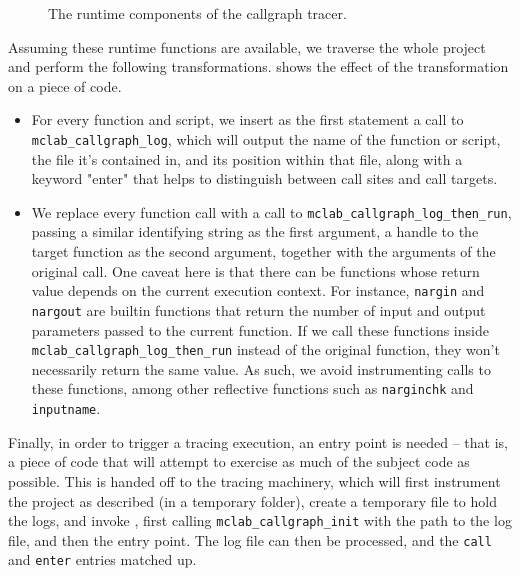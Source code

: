 \begin{figure}

\caption{The runtime components of the callgraph tracer.}
\label{Fig:CallgraphRuntime}
\end{figure}

Assuming these runtime functions are available, we traverse the whole project
and perform the following transformations.  shows
the effect of the transformation on a piece of \matlab code.

\begin{itemize}

\item For every function and script, we insert as the first statement a call to
  \texttt{mclab\_callgraph\_log}, which will output the name of the function or
  script, the file it's contained in, and its position within that file, along
  with a keyword "enter" that helps to distinguish between call sites and call
  targets.

\item We replace every function call with a call to
  \texttt{mclab\_callgraph\_log\_then\_run}, passing a similar identifying
  string as the first argument, a handle to the target function as the second
  argument, together with the arguments of the original call. One caveat here
  is that there can be functions whose return value depends on the current
  execution context. For instance, \texttt{nargin} and \texttt{nargout} are
  builtin functions that return the number of input and output parameters
  passed to the current function. If we call these functions inside
  \texttt{mclab\_callgraph\_log\_then\_run} instead of the original function,
  they won't necessarily return the same value. As such, we avoid instrumenting
  calls to these functions, among other reflective functions such as
  \texttt{narginchk} and \texttt{inputname}.

\end{itemize}

Finally, in order to trigger a tracing execution, an entry point is needed --
that is, a piece of code that will attempt to exercise as much of the subject
code as possible. This is handed off to the tracing machinery, which will first
instrument the project as described (in a temporary folder), create a temporary
file to hold the logs, and invoke \matlab, first calling
\texttt{mclab\_callgraph\_init} with the path to the log file, and then the
entry point. The log file can then be processed, and the \texttt{call} and
\texttt{enter} entries matched up.

